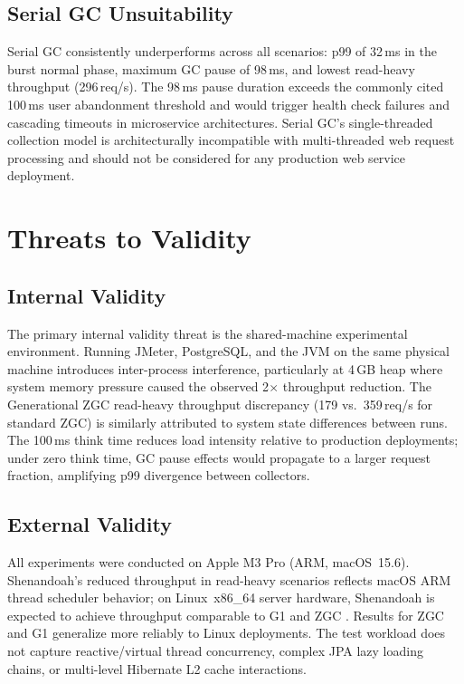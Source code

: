 \subsection{Serial GC Unsuitability}
\label{subsec:serial-unsuitability}

Serial GC consistently underperforms across all scenarios: p99 of 32\,ms in the burst normal phase, maximum GC pause of 98\,ms, and lowest read-heavy throughput (296\,req/s). The 98\,ms pause duration exceeds the commonly cited 100\,ms user abandonment threshold \cite{carpen2015performance} and would trigger health check failures and cascading timeouts in microservice architectures. Serial GC's single-threaded collection model is architecturally incompatible with multi-threaded web request processing and should not be considered for any production web service deployment.

\section{Threats to Validity}
\label{sec:threats}

\subsection{Internal Validity}
\label{subsec:internal-validity}

The primary internal validity threat is the shared-machine experimental environment. Running JMeter, PostgreSQL, and the JVM on the same physical machine introduces inter-process interference, particularly at 4\,GB heap where system memory pressure caused the observed 2$\times$ throughput reduction. The Generational ZGC read-heavy throughput discrepancy (179 vs.\ 359\,req/s for standard ZGC) is similarly attributed to system state differences between runs. The 100\,ms think time reduces load intensity relative to production deployments; under zero think time, GC pause effects would propagate to a larger request fraction, amplifying p99 divergence between collectors.

\subsection{External Validity}
\label{subsec:external-validity}

All experiments were conducted on Apple M3 Pro (ARM, macOS~15.6). Shenandoah's reduced throughput in read-heavy scenarios reflects macOS ARM thread scheduler behavior; on Linux~x86\_64 server hardware, Shenandoah is expected to achieve throughput comparable to G1 and ZGC \cite{flood2016shenandoah}. Results for ZGC and G1 generalize more reliably to Linux deployments. The test workload does not capture reactive/virtual thread concurrency, complex JPA lazy loading chains, or multi-level Hibernate L2 cache interactions.


